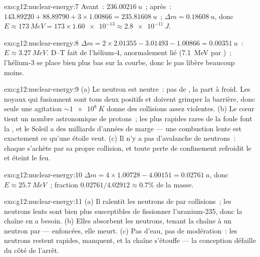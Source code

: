 \begin{solution}{exo:g12:nuclear-energy:7}
Avant~: $\qty{236.00216}{u}$~; après~: $143.89220 + 88.89790 +
3 \times 1.00866 = \qty{235.81608}{u}$~; $\Delta m = \qty{0.18608}{u}$,
donc $E \approx \qty{173}{MeV} = 173 \times \num{1.60e-13} \approx
\qty{2.8e-11}{J}$.
\end{solution}

\begin{solution}{exo:g12:nuclear-energy:8}
$\Delta m = 2 \times 2.01355 - 3.01493 - 1.00866 = \qty{0.00351}{u}$~:
$E \approx \qty{3.27}{MeV}$. D--T fait de l'hélium-4, anormalement lié
(\qty{7.1}{MeV} par )~; l'hélium-3 se
place bien plus bas sur la courbe, donc le pas libère beaucoup moins.
\end{solution}

\begin{solution}{exo:g12:nuclear-energy:9}
(a) Le neutron est neutre~: pas de , la  part à froid. Les noyaux qui
fusionnent sont tous deux positifs et doivent grimper la barrière,
donc seule une agitation $\sim \qty{1e8}{K}$ donne des collisions
assez violentes. (b) Le cœur tient un nombre astronomique de protons~;
les plus rapides rares de la foule font la , et le Soleil a des
milliards d'années de marge --- une combustion lente est exactement
ce qu'une étoile veut. (c) Il n'y a pas d'avalanche de neutrons~:
chaque  s'achète par sa propre collision, et
toute perte de confinement refroidit le
 et éteint le feu.
\end{solution}

\begin{solution}{exo:g12:nuclear-energy:10}
$\Delta m = 4 \times 1.00728 - 4.00151 = \qty{0.02761}{u}$, donc
$E \approx \qty{25.7}{MeV}$~; fraction
$0.02761/4.02912 \approx 0.7\%$ de la masse.
\end{solution}

\begin{solution}{exo:g12:nuclear-energy:11}
(a) Il ralentit les neutrons de  par
collisions~; les neutrons lents sont bien plus susceptibles de
fissionner l'uranium-235, donc la chaîne en a
besoin. (b) Elles absorbent les neutrons, tenant la chaîne à un
neutron par  --- enfoncées, elle meurt.
(c) Pas d'eau, pas de modération~: les neutrons restent rapides,
manquent, et la chaîne s'étouffe --- la conception défaille du côté
de l'arrêt.
\end{solution}

